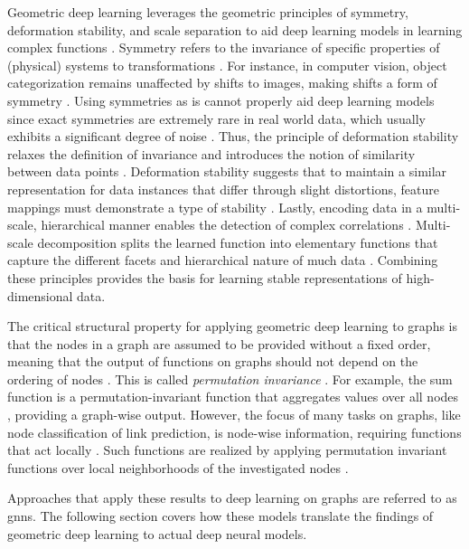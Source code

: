 Geometric deep learning leverages the geometric principles of symmetry, deformation stability, and scale separation to aid deep learning models in learning complex functions \cite{bronstein_geometric_2021}. Symmetry refers to the invariance of specific properties of (physical) systems to transformations \cite{bronstein_geometric_2021}. For instance, in computer vision, object categorization remains unaffected by shifts to images, making shifts a form of symmetry \cite{bronstein_geometric_2021}. Using symmetries as is cannot properly aid deep learning models since exact symmetries are extremely rare in real world data, which usually exhibits a significant degree of noise \cite{bronstein_geometric_2021}. Thus, the principle of deformation stability relaxes the definition of invariance and introduces the notion of similarity between data points \cite{bronstein_geometric_2021}. Deformation stability suggests that to maintain a similar representation for data instances that differ through slight distortions, feature mappings must demonstrate a type of stability \cite{bronstein_geometric_2021}. Lastly, encoding data in a multi-scale, hierarchical manner enables the detection of complex correlations \cite{bronstein_geometric_2021}. Multi-scale decomposition splits the learned function into elementary functions that capture the different facets and hierarchical nature of much data \cite{bronstein_geometric_2021}. Combining these principles provides the basis for learning stable representations of high-dimensional data.

The critical structural property for applying geometric deep learning to graphs is that the nodes in a graph are assumed to be provided without a fixed order, meaning that the output of functions on graphs should not depend on the ordering of nodes \cite{bronstein_geometric_2021}. This is called \textit{permutation invariance} \cite{bronstein_geometric_2021}. For example, the sum function is a permutation-invariant function that aggregates values over all nodes \cite{bronstein_geometric_2021}, providing a graph-wise output. However, the focus of many tasks on graphs, like node classification of link prediction, is node-wise information, requiring functions that act locally \cite{bronstein_geometric_2021}. Such functions are realized by applying permutation invariant functions over local neighborhoods of the investigated nodes \cite{bronstein_geometric_2021}. 

Approaches that apply these results to deep learning on graphs are referred to as \glspl{gnn}. The following section covers how these models translate the findings of geometric deep learning to actual deep neural models.

